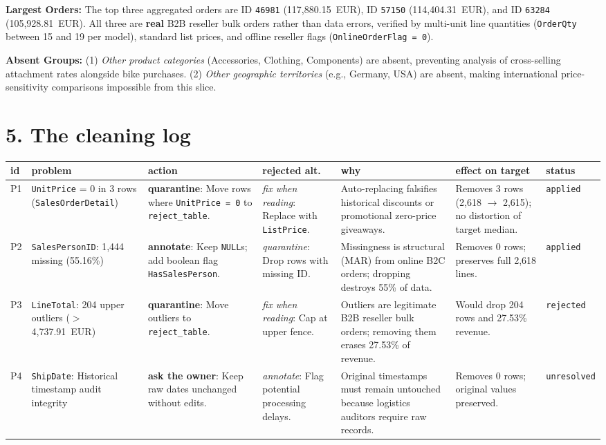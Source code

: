 \documentclass[10pt,a4paper]{article}
\newcommand{\dec}[1]{\textbf{\textcolor{hl}{#1}}}
\begin{document}
\textbf{Largest Orders:} The top three aggregated orders are ID \texttt{46981} (117,880.15~EUR), ID \texttt{57150} (114,404.31~EUR), and ID \texttt{63284} (105,928.81~EUR). All three are \dec{real} B2B reseller bulk orders rather than data errors, verified by multi-unit line quantities (\texttt{OrderQty} between 15 and 19 per model), standard list prices, and offline reseller flags (\texttt{OnlineOrderFlag = 0}).

\textbf{Absent Groups:} (1) \emph{Other product categories} (Accessories, Clothing, Components) are absent, preventing analysis of cross-selling attachment rates alongside bike purchases. (2) \emph{Other geographic territories} (e.g., Germany, USA) are absent, making international price-sensitivity comparisons impossible from this slice.

\section*{5. The cleaning log}
\begin{table}[h!]
\centering
\small
\begin{tabular}{p{0.5cm}p{2.5cm}p{2.8cm}p{2.3cm}p{2.8cm}p{2.2cm}p{1.3cm}}
\toprule
\textbf{id} & \textbf{problem} & \textbf{action} & \textbf{rejected alt.} & \textbf{why} & \textbf{effect on target} & \textbf{status} \\
\midrule
P1 & \texttt{UnitPrice} = 0 in 3 rows (\texttt{SalesOrderDetail}) & \dec{quarantine}: Move rows where \texttt{UnitPrice = 0} to \texttt{reject\_table}. & \emph{fix when reading}: Replace with \texttt{ListPrice}. & Auto-replacing falsifies historical discounts or promotional zero-price giveaways. & Removes 3 rows (2,618 $\rightarrow$ 2,615); no distortion of target median. & \texttt{applied} \\
P2 & \texttt{SalesPersonID}: 1,444 missing (55.16\%) & \dec{annotate}: Keep \texttt{NULL}s; add boolean flag \texttt{HasSalesPerson}. & \emph{quarantine}: Drop rows with missing ID. & Missingness is structural (MAR) from online B2C orders; dropping destroys 55\% of data. & Removes 0 rows; preserves full 2,618 lines. & \texttt{applied} \\
P3 & \texttt{LineTotal}: 204 upper outliers ($>$4,737.91~EUR) & \dec{quarantine}: Move outliers to \texttt{reject\_table}. & \emph{fix when reading}: Cap at upper fence. & Outliers are legitimate B2B reseller bulk orders; removing them erases 27.53\% of revenue. & Would drop 204 rows and 27.53\% revenue. & \texttt{rejected} \\
P4 & \texttt{ShipDate}: Historical timestamp audit integrity & \dec{ask the owner}: Keep raw dates unchanged without edits. & \emph{annotate}: Flag potential processing delays. & Original timestamps must remain untouched because logistics auditors require raw records. & Removes 0 rows; original values preserved. & \texttt{unresolved} \\
\bottomrule
\end{tabular}
\end{table}
\end{document}
